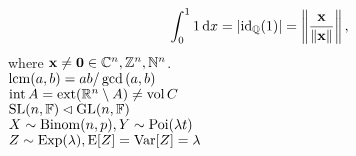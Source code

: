 \documentclass[varwidth]{standalone}
\begin{document}
\[
  \int_{0}^{1} 1 \ud x = \abs{\id_{\Q}(1)} =
  \normlr{\frac{\vect{x}}{\norm{\vect{x}}}},
\]
where $\vect{x} \ne \zeros \in \C^n, \Z^n, \N^n$.\\
$\lcm(a,b)=ab/\gcd{(a,b)}$\\
$\interior A=\exterior (\R^n \setminus A) \ne \volume C$\\
$\SL(n,\F) \lhd \GL(n,\F)$\\
$X \sim \Binom(n,p), Y \sim \Poi(\lambda t)$\\
$Z \sim \Exp(\lambda), \E[Z] = \Var[Z] = \lambda$
\end{document}
